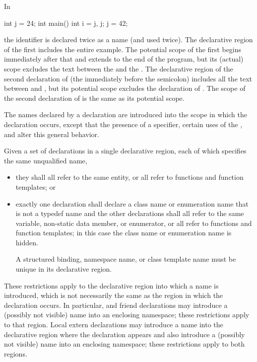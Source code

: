 \pnum
\begin{example}
In
\begin{codeblock}
int j = 24;
int main() {
  int i = j, j;
  j = 42;
}
\end{codeblock}
the identifier  is declared twice as a name (and used twice).
The declarative region of the first  includes the entire
example. The potential scope of the first  begins immediately
after that  and extends to the end of the program, but its
(actual) scope excludes the text between the \tcode{,} and the
\tcode{\}}. The declarative region of the second declaration of
 (the  immediately before the semicolon) includes all
the text between \tcode{\{} and \tcode{\}}, but its potential scope
excludes the declaration of . The scope of the second
declaration of  is the same as its potential scope.
\end{example}

\pnum
The names declared by a declaration are introduced into the scope in
which the declaration occurs, except that the presence of a
 specifier, certain uses of the
, and
 alter this general
behavior.

\pnum
Given a set of declarations in a single declarative region, each of
which specifies the same unqualified name,
\begin{itemize}
\item they shall all refer to the same entity, or all refer to functions
and function templates; or
\item exactly one declaration shall declare a class name or enumeration
name that is not a typedef name and the other declarations shall
all refer to the same variable, non-static data member, or enumerator,
or all refer to functions and function templates;
in this case the class name or enumeration name is
hidden.
\begin{note}
A structured binding,
namespace name, or
class template name
must be unique in its declarative region.
\end{note}
\end{itemize}
\begin{note}
These restrictions apply to the declarative region into which
a name is introduced, which is not necessarily the same as the region in
which the declaration occurs. In particular,
 and
friend declarations may introduce a (possibly not
visible) name into an enclosing namespace; these restrictions apply to
that region. Local extern declarations may introduce
a name into the declarative region where the declaration appears and
also introduce a (possibly not visible) name into an enclosing
namespace; these restrictions apply to both regions.
\end{note}

